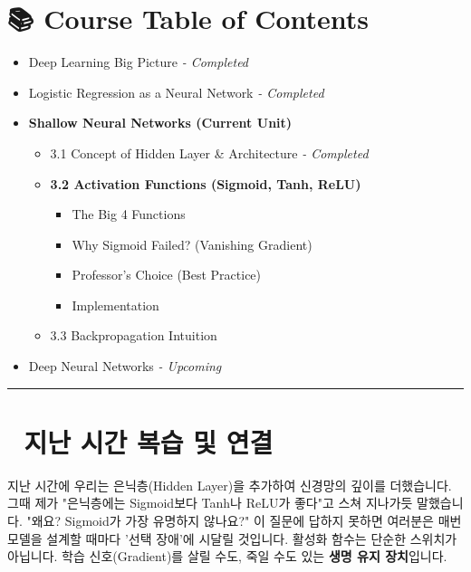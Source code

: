 \documentclass[11pt,a4paper]{book}
\theoremstyle{definition}
\begin{document}
\section*{📚 Course Table of Contents}
\begin{itemize}
    \item[Chapter 1.] Deep Learning Big Picture \textit{- Completed}
    \item[Chapter 2.] Logistic Regression as a Neural Network \textit{- Completed}
    \item[\textbf{Chapter 3.}] \textbf{Shallow Neural Networks (Current Unit)}
    \begin{itemize}
        \item 3.1 Concept of Hidden Layer \& Architecture \textit{- Completed}
        \item \textbf{3.2 Activation Functions (Sigmoid, Tanh, ReLU)}
        \begin{itemize}
            \item The Big 4 Functions
            \item Why Sigmoid Failed? (Vanishing Gradient)
            \item Professor's Choice (Best Practice)
            \item Implementation
        \end{itemize}
        \item 3.3 Backpropagation Intuition
    \end{itemize}
    \item[Chapter 4.] Deep Neural Networks \textit{- Upcoming}
\end{itemize}

\vspace{0.5cm}
\hrule
\vspace{0.5cm}

\section*{🔗 지난 시간 복습 및 연결}
지난 시간에 우리는 은닉층(Hidden Layer)을 추가하여 신경망의 깊이를 더했습니다. 그때 제가 "은닉층에는 Sigmoid보다 Tanh나 ReLU가 좋다"고 스쳐 지나가듯 말했습니다.
"왜요? Sigmoid가 가장 유명하지 않나요?"
이 질문에 답하지 못하면 여러분은 매번 모델을 설계할 때마다 '선택 장애'에 시달릴 것입니다. 활성화 함수는 단순한 스위치가 아닙니다. 학습 신호(Gradient)를 살릴 수도, 죽일 수도 있는 \textbf{생명 유지 장치}입니다.

\end{document}
